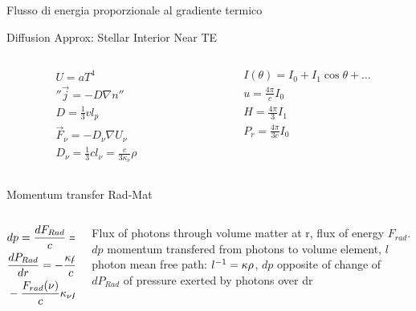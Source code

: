 \begin{frame}{Flusso di energia proporzionale al gradiente termico}
\begin{block}{Diffusion Approx: Stellar Interior Near TE}
    \begin{columns}[T]
        \begin{column}{0.5\textwidth}
    \begin{align*}
                &U=aT^4\\
                &''\vec{j}=-D\nabla n''\tag{diffusion}\\
                &D=\frac{1}{3}vl_p\\
                &\vec{F}_{\nu}=-D_{\nu}\nabla U_{\nu}\\
                &D_{\nu}=\frac{1}{3}cl_{\nu}=\frac{c}{3\kappa_{\nu}}\rho
            \end{align*}
        \end{column}
        \begin{column}{0.5\textwidth}
            \begin{align*}
                &I(\theta)=I_0+I_1\cos{\theta}+\ldots\\
                &u=\frac{4\pi}{c}I_0\\
                &H=\frac{4\pi}{3}I_1\\
                &P_r=\frac{4\pi}{3c}I_0
            \end{align*}
        \end{column}
    \end{columns}
    
\end{block}

\begin{block}{Momentum transfer Rad-Mat}
    \begin{columns}[T]
        \begin{column}{0.6\textwidth}
    \begin{align*}
        &dp=\frac{dF_{Rad}}{c}=\frac{F_{Rad}}{c}\frac{dr}{l}\\
        &\TDy{r}{P_{Rad}}=-\frac{\kappa\rho}{c}F_{Rad}\\
        &-\frac{F_{rad}(\nu)}{c}\kappa_{\nu}\rho\,dr=\frac{4\pi}{3c}\TDy{r}{B_{\nu}(T)}\,dr\tag{L-grad T}
    \end{align*}
        \end{column}
        \begin{column}{0.4\textwidth}
            Flux of photons through volume matter at r, flux of energy $F_{rad}$. $dp$ momentum transfered from photons to volume element, $l$ photon mean free path: $\invers{l}=\kappa\rho$, $dp$ opposite of change of $dP_{Rad}$ of pressure exerted by photons over dr    
        \end{column}
    \end{columns}
    
\end{block}
\end{frame}


